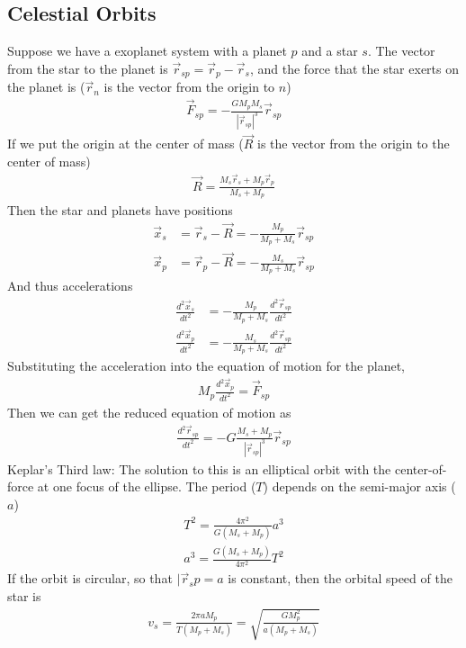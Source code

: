 \begin{multicols}{2}
\section{Celestial Orbits}
Suppose we have a exoplanet system with a planet $p$ and a star $s$. The vector from the star to the planet is $\vec{r}_{sp}=\vec{r}_p-\vec{r}_s$, and the force that the star exerts on the planet is ($\vec{r}_n$ is the vector from the origin to $n$)
\begin{align}
\vec{F}_{sp}=-\frac{GM_pM_s}{|\vec{r}_{sp}|^3}\vec{r}_{sp}
\end{align}
If we put the origin at the center of mass ($\vec{R}$ is the vector from the origin to the center of mass)
\begin{align}
\vec{R}=\frac{M_s\vec{r}_s+M_p\vec{r}_p}{M_s+M_p}
\end{align}
Then the star and planets have positions
\begin{align}
\vec{x}_s &= \vec{r}_s-\vec{R}=-\frac{M_p}{M_p+M_s}\vec{r}_{sp} \\
\vec{x}_p &= \vec{r}_p-\vec{R}=-\frac{M_s}{M_p+M_s}\vec{r}_{sp} 
\end{align}
And thus accelerations
\begin{align}
\frac{d^2\vec{x}_s}{dt^2} &=-\frac{M_p}{M_p+M_s}\frac{d^2 \vec{r}_{sp}}{dt^2} \\
\frac{d^2\vec{x}_p}{dt^2} &=-\frac{M_s}{M_p+M_s}\frac{d^2 \vec{r}_{sp}}{dt^2} 
\end{align}
Substituting the acceleration into the equation of motion for the planet,
\begin{align}
M_p\frac{d^2 \vec{x}_p}{dt^2}=\vec{F}_{sp}
\end{align}
Then we can get the reduced equation of motion as
\begin{align}
\frac{d^2 \vec{r}_{sp}}{dt^2}=-G\frac{M_s+M_p}{|\vec{r}_{sp}|^3}\vec{r}_{sp}
\end{align}
Keplar's Third law: The solution to this is an elliptical orbit with the center-of-force at one focus of the ellipse. The period ($T$) depends on the semi-major axis ($a$)
\begin{align}
T^2=\frac{4\pi^2}{G(M_s+M_p)}a^3 \\
a^3=\frac{G(M_s+M_p)}{4\pi^2}T^2
\end{align}
If the orbit is circular, so that $|\vec{r}_sp=a$ is constant, then the orbital speed of the star is
\begin{align}
v_s=\frac{2\pi aM_p}{T(M_p+M_s)}=\sqrt{\frac{GM_p^2}{a(M_p+M_s)}}
\end{align}

\end{multicols}
